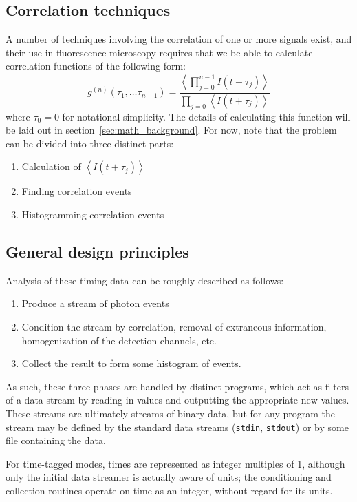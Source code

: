 \documentclass{article}
\newcommand{\angles}[1]{\ensuremath{\left\langle #1 \right\rangle}}
\newcommand{\stdin}{\texttt{stdin}}
\newcommand{\stdout}{\texttt{stdout}}
\newcommand{\gn}[1]{\ensuremath{g^{(#1)}}}
\newcommand{\timedelay}{\ensuremath{\tau}}
\renewcommand{\time}{\ensuremath{t}}
\newcommand{\intensity}{\ensuremath{I}}
\numberwithin{equation}{section}
\numberwithin{figure}{section}
\begin{document}
\subsection{Correlation techniques}
A number of techniques involving the correlation of one or more signals exist, and their use in fluorescence microscopy requires that we be able to calculate correlation functions of the following form:
\begin{equation}
\gn{n}(\timedelay_{1}, \ldots \timedelay_{n-1}) = 
    \frac{\angles{\prod_{j=0}^{n-1}{\intensity(\time+\timedelay_{j})}}}
	     {\prod_{j=0}{\angles{\intensity(\time+\timedelay_{j})}}}
\end{equation}
where $\timedelay_{0}=0$ for notational simplicity. The details of calculating this function will be laid out in section~\ref{sec:math_background}. For now, note that the problem can be divided into three distinct parts:
\begin{enumerate}
\item Calculation of \angles{\intensity(\time+\timedelay_{j})}
\item Finding correlation events
\item Histogramming correlation events
\end{enumerate}

\subsection{General design principles}
Analysis of these timing data can be roughly described as follows:
\begin{enumerate}
\item Produce a stream of photon events
\item Condition the stream by correlation, removal of extraneous information, homogenization of the detection channels, etc.
\item Collect the result to form some histogram of events.
\end{enumerate}
As such, these three phases are handled by distinct programs, which act as filters of a data stream by reading in values and outputting the appropriate new values. These streams are ultimately streams of binary data, but for any program the stream may be defined by the standard data streams (\stdin, \stdout) or by some file containing the data. 

For time-tagged modes, times are represented as integer multiples of 1\pico\second, although only the initial data streamer is actually aware of units; the conditioning and collection routines operate on time as an integer, without regard for its units.
\end{document}
